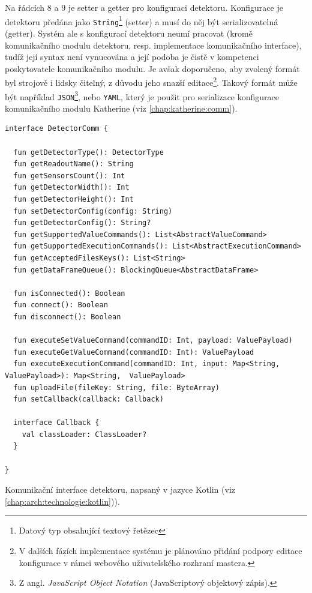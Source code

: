 Na řádcích 8 a 9 je setter a getter pro konfiguraci detektoru. Konfigurace je detektoru předána jako \texttt{String}\footnote{Datový typ obsahující textový řetězec} (setter) a musí do něj být serializovatelná (getter). Systém ale s konfigurací detektoru neumí pracovat (kromě komunikačního modulu detektoru, resp. implementace komunikačního interface), tudíž její syntax není vynucována a její podoba je čistě v kompetenci poskytovatele komunikačního modulu. Je avšak doporučeno, aby zvolený formát byl strojově i lidsky čitelný, z důvodu jeho snazší editace\footnote{V dalších fázích implementace systému je plánováno přidání podpory editace konfigurace v rámci webového uživatelského rozhraní mastera.}. Takový formát může být například \texttt{JSON}\footnote{Z angl. \textit{JavaScript Object Notation} (JavaScriptový objektový zápis).}, nebo \texttt{YAML}, který je použit pro serializace konfigurace komunikačního modulu Katherine (viz \ref{chap:katherine:comm}).

\begin{code}[h!]
\begin{verbatim}
interface DetectorComm {

  fun getDetectorType(): DetectorType
  fun getReadoutName(): String
  fun getSensorsCount(): Int
  fun getDetectorWidth(): Int
  fun getDetectorHeight(): Int
  fun setDetectorConfig(config: String)
  fun getDetectorConfig(): String?
  fun getSupportedValueCommands(): List<AbstractValueCommand>
  fun getSupportedExecutionCommands(): List<AbstractExecutionCommand>
  fun getAcceptedFilesKeys(): List<String>
  fun getDataFrameQueue(): BlockingQueue<AbstractDataFrame>
  
  fun isConnected(): Boolean
  fun connect(): Boolean
  fun disconnect(): Boolean
  
  fun executeSetValueCommand(commandID: Int, payload: ValuePayload)
  fun executeGetValueCommand(commandID: Int): ValuePayload
  fun executeExecutionCommand(commandID: Int, input: Map<String, ValuePayload>): Map<String,  ValuePayload>
  fun uploadFile(fileKey: String, file: ByteArray)
  fun setCallback(callback: Callback)
  
  interface Callback {
    val classLoader: ClassLoader?
  }

}
\end{verbatim}
\caption{Komunikační interface detektoru, napsaný v jazyce Kotlin (viz \ref{chap:arch:technologie:kotlin})).}
\label{src:handler:comm_intf}
\end{code}

